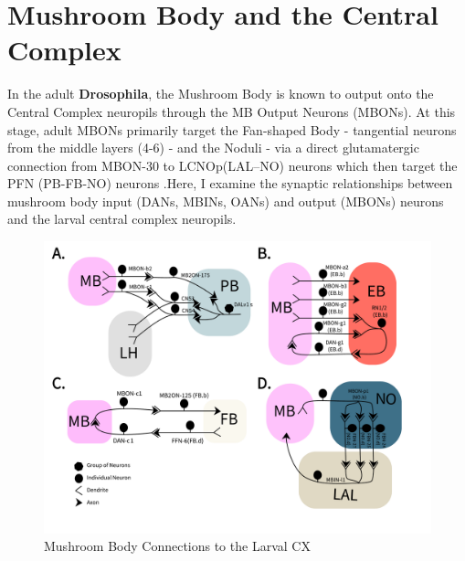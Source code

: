



\section{Mushroom Body and the Central Complex}
    \label{CXMB}
    In the adult \textbf{Drosophila}, the Mushroom Body is known to output onto the Central Complex neuropils through the MB Output Neurons (MBONs). At this stage, adult MBONs primarily target the Fan-shaped Body - tangential neurons from the middle layers (4-6) - and the Noduli - via a direct glutamatergic connection from MBON-30 to LCNOp(LAL–NO) neurons which then target the PFN (PB-FB-NO) neurons \citep{hulse2021connectome}.Here, I examine the synaptic relationships between mushroom body input (DANs, MBINs, OANs) and output (MBONs) neurons and the larval central complex neuropils. 
        
    \begin{figure}
        \centering
        \includegraphics[width=17cm]{Figs/CX/MBtoCX.pdf}
        \caption[Mushroom Body Connections to the Larval CX]{Mushroom Body Connections to the Larval CX}
        \label{MBtoCX}
    \end{figure}

